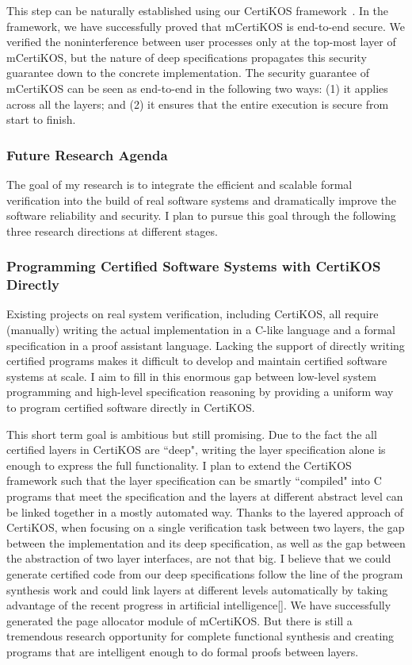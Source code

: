 \documentclass[a4paper, 10pt]{article}
\begin{document}
\begin{small}
This step can be naturally established
using our CertiKOS framework~\cite{pldi16-security}. In the framework,
we have successfully proved that mCertiKOS is end-to-end secure. We verified the noninterference between user processes 
only at the top-most layer of mCertiKOS, but the nature of deep specifications propagates
this security guarantee down to the concrete implementation.
The security guarantee of mCertiKOS
can be seen as end-to-end in the following two ways: (1)
it applies across all the layers; and (2) it ensures that the entire
execution is secure from start to finish.

\subsubsection*{\large Future Research Agenda}
The goal of my research is to
integrate the efficient and scalable formal verification
into the build of real software systems
and dramatically improve the software reliability and security. 
I plan to pursue this goal through the following three research directions at different stages.


\subsubsection*{\small Programming Certified Software Systems with CertiKOS Directly}
Existing  projects on real system verification,
including CertiKOS, all require   (manually)  writing the actual implementation
 in a C-like language and a formal specification in a proof assistant language.
Lacking the support of directly writing certified  programs  makes it difficult to develop and maintain certified  software systems
at scale. I aim to fill in this enormous gap between low-level system programming and high-level specification reasoning
by
providing
a uniform way to program certified software directly in CertiKOS.

This short term goal is ambitious  but still promising.
Due to the fact the all certified layers in CertiKOS
are ``deep", writing the layer specification alone is enough
to express the full functionality. I plan to extend the CertiKOS
framework such that the layer specification can be smartly 
``compiled" into C programs that meet the specification
and the layers at different abstract level can be linked together in a mostly automated way. Thanks to the layered approach of CertiKOS,
when focusing on a single verification task between two layers,
 the gap between the implementation and its deep specification, as well as the gap between the abstraction of two layer interfaces,
are not that big. I believe that we could generate
certified code from our deep specifications
follow the line of the program synthesis work
and could link layers at different levels automatically
by taking advantage of the recent progress in
artificial intelligence[]. We have successfully generated
the page allocator module of mCertiKOS. But there is
still a tremendous research opportunity for complete functional
synthesis and creating programs that are intelligent enough
to do formal proofs between layers.


\end{small}
\end{document}
